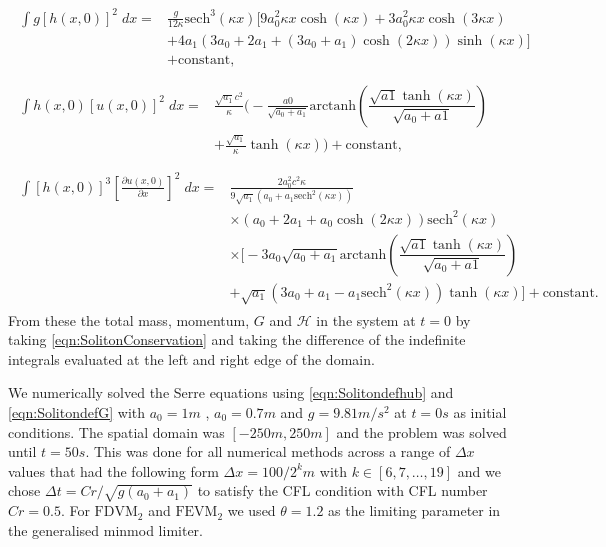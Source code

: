 \begin{align*}
\begin{split}
\int g\left[h(x,0)\right]^2 \; dx ={}& \frac{g}{12 \kappa }\text{sech}^3\left(\kappa x\right) \Bigg[9a_0^2 \kappa x \cosh\left(\kappa x\right) + 3 a_0^2 \kappa x \cosh\left(3\kappa x\right) \\ &+ 4 a_1 \left(3a_0 + 2 a_1 + \left(3a_0 + a_1\right)\cosh\left(2\kappa x\right)\right) \sinh\left(\kappa x\right)\Bigg] \\ &+ \text{constant},
\end{split}\\ \\
\begin{split}
\int h(x,0)\left[u(x,0)\right]^2 \; dx = {}& \frac{\sqrt{a_1}c^2}{\kappa} \Bigg( -\frac{a0}{\sqrt{a_0 + a_1}} \text{arctanh}\left(\dfrac{\sqrt{a1} \tanh\left(\kappa x\right)}{\sqrt{a_0 + a1}}\right)\\ &+ \frac{\sqrt{a_1}}{\kappa}\tanh\left(\kappa x\right)\Bigg)  + \text{constant},
\end{split} 
\\ \\
\begin{split}
\int \left[h(x,0)\right]^3 \left[\frac{\partial u(x,0)}{\partial x}\right]^2 \; dx = {}& \frac{2a_0^2c^2 \kappa }{9 \sqrt{a_1} \left(a_0 + a_1\text{sech}^2\left(\kappa x \right) \right)}   \\ &\times\left(a_0 + 2a_1 + a_0 \cosh\left(2\kappa x\right) \right) \text{sech}^2\left(\kappa x\right) \\&\times \Bigg[-3 a_0 \sqrt{a_0 + a_1}\text{arctanh}\left(\dfrac{\sqrt{a1} \tanh\left(\kappa x\right)}{\sqrt{a_0 + a1}}\right)  \\ &+ \sqrt{a_1}\left(3a_0 + a_1 - a_1\text{sech}^2\left(\kappa x\right)\right)\tanh(\kappa x) \Bigg]+ \text{constant}.
\end{split}
\end{align*}
From these the total mass, momentum, $G$ and $\mathcal{H}$ in the system at $t= 0$ by taking \eqref{eqn:SolitonConservation} and taking the difference of the indefinite integrals evaluated at the left and right edge of the domain. 

We numerically solved the Serre equations using \eqref{eqn:Solitondefhub} and \eqref{eqn:SolitondefG} with $a_0 = 1m$ , $a_0 = 0.7m$ and $g= 9.81m/s^2$ at $t=0s$ as initial conditions. The spatial domain was $[-250m,250m]$ and the problem was solved until $t= 50s$. This was done for all numerical methods across a range of $\Delta x$ values that had the following form $\Delta x = 100 / 2^k m$ with $k \in  \left[6,7, \dots,19\right]$ and we chose $\Delta t = Cr / \sqrt{g\left(a_0 + a_1\right)}$ to satisfy the CFL condition with CFL number $Cr = 0.5$. For $\text{FDVM}_2$ and $\text{FEVM}_2$ we used $\theta  = 1.2$ as the limiting parameter in the generalised minmod limiter. 

